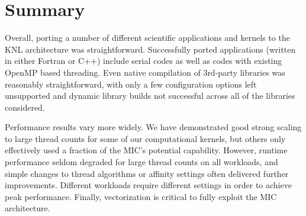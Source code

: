 \section{Summary}
\label{sec:summary}

%
%
Overall, porting a number of different scientific applications and
kernels to the KNL architecture was 
straightforward. Successfully ported applications (written in either
Fortran or C++) include serial codes as well as codes with existing
OpenMP based threading. Even native compilation of 3rd-party
libraries was reasonably straightforward, with only a few
configuration options left unsupported and dynamic library builds not
successful across all of the libraries considered.

Performance results vary more widely.
We have demonstrated good strong scaling to large thread counts for some of our computational
kernels, but others only effectively used a fraction of the MIC's
potential capability.  However, runtime performance seldom degraded
for large thread counts on all workloads, and simple changes to
thread algorithms or affinity settings often delivered further
improvements.  Different workloads require different settings in order
to achieve peak performance. Finally, vectorization is critical to
fully exploit the MIC architecture. 